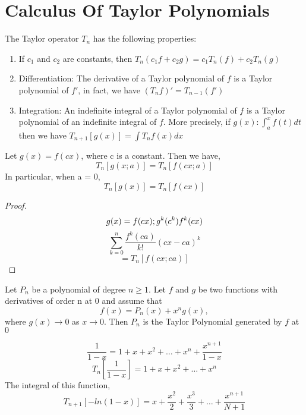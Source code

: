 \documentclass[twoside]{report}
\begin{document}
\section{Calculus Of Taylor Polynomials}
\begin{theorem}
	The Taylor operator $T_n$ has the following properties:
	\begin{enumerate}
		\item If $c_1$ and $c_2$ are constants, then $T_n(c_1f + c_2g) = c_1 T_n(f) + c_2 T_n(g)$
		\item Differentiation: The derivative of a Taylor polynomial of $f$ is a Taylor polynomial of $f'$, in fact, we have
		   $(T_n f)' = T_{n-1} (f')$
		\item Integration: An indefinite integral of a Taylor polynomial of $f$ is a Taylor polynomial of an indefinite integral of $f$. More precisely, if $g(x): \int_a^x f(t) dt$ then we have $T_{n+1}[g(x)] = \int T_n f(x)dx$
	\end{enumerate}
\end{theorem}
\begin{theorem}
   Let $g(x) = f(cx)$, where c is a constant. Then we have,
   \[
      T_n [g(x;a)] = T_n[f(cx;a)]
   \]
   In particular, when a = 0,
   \[
      T_n[g(x)] = T_n[f(cx)]
   \]
\end{theorem}
\begin{proof}
	\begin{displaymath}
	   g(x) = f(cx) ; g^{k}(c^k) f^{k} (cx) \\ 
	\end{displaymath}
	\[
	   \sum_{k=0}^n \frac{f^{k}(ca)}{k!}(cx -ca)^k
	\]
	\[
	   = T_n [f(cx;ca)]
	\]
\end{proof}
\begin{theorem}
	Let $P_n$ be a polynomial of degree $n \geq 1$. Let $f$ and $g$ be two functions with derivatives of order n at 0 and assume that	
	\[
	   f(x) = P_n(x) + x^n g(x),
	\]
	where $g(x) \rightarrow 0$ as $x \rightarrow 0$. Then $P_n$ is the Taylor Polynomial generated by $f$ at $0$
\end{theorem}
\begin{example}
   \[
   	\frac{1}{1-x} = 1 + x + x^2 + \dots + x^n + \frac{x^{n+1}}{1-x}
   \]
   \[
      T_n[\frac{1}{1-x}] = 1 + x + x^2 + \dots + x^n
   \]
   The integral of this function,
   \[
      T_{n+1} [-ln(1-x)] = x + \frac{x^2}{2} + \frac{x^3}{3} + \dots + \frac{x^{n+1}}{N+1}
   \]
\end{example}
\end{document}
